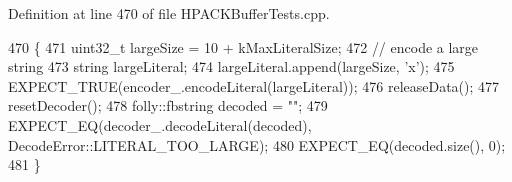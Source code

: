 Definition at line 470 of file H\+P\+A\+C\+K\+Buffer\+Tests.\+cpp.


\begin{DoxyCode}
470                                             \{
471   uint32\_t largeSize = 10 + kMaxLiteralSize;
472   \textcolor{comment}{// encode a large string}
473   \textcolor{keywordtype}{string} largeLiteral;
474   largeLiteral.append(largeSize, \textcolor{charliteral}{'x'});
475   EXPECT\_TRUE(encoder\_.encodeLiteral(largeLiteral));
476   releaseData();
477   resetDecoder();
478   folly::fbstring decoded = \textcolor{stringliteral}{""};
479   EXPECT\_EQ(decoder\_.decodeLiteral(decoded), DecodeError::LITERAL\_TOO\_LARGE);
480   EXPECT\_EQ(decoded.size(), 0);
481 \}
\end{DoxyCode}
